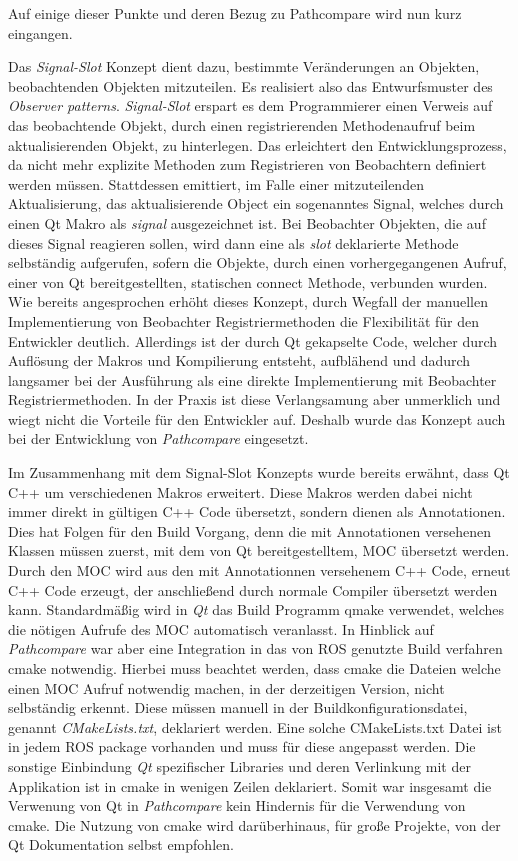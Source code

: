Auf einige dieser Punkte und deren Bezug zu Pathcompare wird nun kurz eingangen.

Das \textit{Signal-Slot} Konzept dient dazu, bestimmte Veränderungen an
Objekten, beobachtenden Objekten mitzuteilen.  Es realisiert also das
Entwurfsmuster des \textit{Observer patterns}.  \textit{Signal-Slot} erspart es
dem Programmierer einen Verweis auf das beobachtende Objekt, durch einen
registrierenden Methodenaufruf beim aktualisierenden Objekt, zu hinterlegen.
Das erleichtert den Entwicklungsprozess, da nicht mehr explizite Methoden zum
Registrieren von Beobachtern definiert werden müssen.  Stattdessen emittiert,
im Falle einer mitzuteilenden Aktualisierung, das aktualisierende Object ein
sogenanntes Signal, welches durch einen Qt Makro als \textit{signal}
ausgezeichnet ist. Bei Beobachter Objekten, die auf dieses Signal reagieren
sollen, wird dann eine als \textit{slot} deklarierte Methode selbständig
aufgerufen, sofern die Objekte, durch einen vorhergegangenen Aufruf, einer von
Qt bereitgestellten, statischen connect Methode, verbunden wurden. Wie bereits
angesprochen erhöht dieses Konzept, durch Wegfall der manuellen Implementierung
von Beobachter Registriermethoden die Flexibilität für den Entwickler deutlich.
Allerdings ist der durch Qt gekapselte Code, welcher durch Auflösung der Makros
und Kompilierung entsteht, aufblähend und dadurch langsamer bei der Ausführung
als eine direkte Implementierung mit Beobachter Registriermethoden. In der
Praxis ist diese Verlangsamung aber unmerklich und wiegt nicht die Vorteile für
den Entwickler auf. Deshalb wurde das Konzept auch bei der Entwicklung von
\textit{Pathcompare} eingesetzt. 

Im Zusammenhang mit dem Signal-Slot Konzepts wurde bereits erwähnt, dass Qt C++
um verschiedenen Makros erweitert. Diese Makros werden dabei nicht immer direkt
in gültigen C++ Code übersetzt, sondern dienen als Annotationen. Dies hat
Folgen für den Build Vorgang, denn die mit Annotationen versehenen Klassen
müssen zuerst, mit dem von Qt bereitgestelltem, \gls{MOC} übersetzt werden.
Durch den MOC wird aus den mit Annotationnen versehenem C++ Code, erneut C++
Code erzeugt, der anschließend durch normale Compiler übersetzt werden kann.
Standardmäßig wird in \textit{Qt} das Build Programm qmake verwendet, welches
die nötigen Aufrufe des \gls{MOC} automatisch veranlasst. In Hinblick auf
\textit{Pathcompare} war aber eine Integration in das von ROS genutzte Build
verfahren cmake notwendig. Hierbei muss beachtet werden, dass cmake die Dateien
welche einen \gls{MOC} Aufruf notwendig machen, in der derzeitigen Version,
nicht selbständig erkennt. Diese müssen manuell in der
Buildkonfigurationsdatei, genannt \textit{CMakeLists.txt}, deklariert werden.
Eine solche CMakeLists.txt Datei ist in jedem ROS package vorhanden und muss
für diese angepasst werden. Die sonstige Einbindung \textit{Qt} spezifischer
Libraries und deren Verlinkung mit der Applikation ist in cmake in wenigen
Zeilen deklariert. Somit war insgesamt die Verwenung von Qt in
\textit{Pathcompare} kein Hindernis für die Verwendung von cmake. Die Nutzung
von cmake wird darüberhinaus, für große Projekte, von der Qt Dokumentation
selbst empfohlen.

